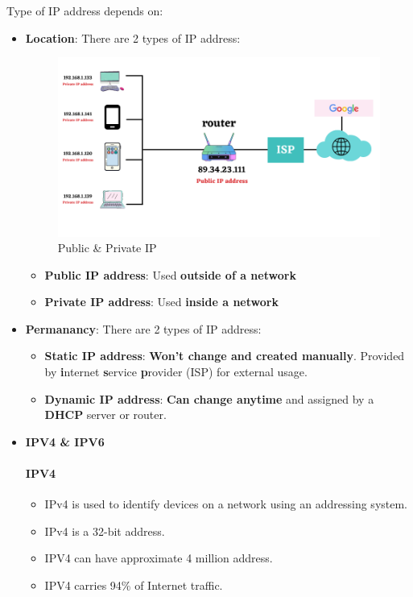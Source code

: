 \setlength{\columnsep}{3pt}
\begin{flushleft}

Type of IP address depends on:
\begin{itemize}
	\item \textbf{Location}: There are 2 types of IP address:
	\begin{figure}[h!]
		\centering
		\includegraphics[scale=0.4]{content/chapter14/images/public_private.png}
		\caption{Public \& Private IP}
		\label{fig:public_private_ip}
	\end{figure}
	
	\begin{itemize}
		\item \textbf{Public IP address}: Used \textbf{outside of a network}
		\item \textbf{Private IP address}: Used \textbf{inside a network}
	\end{itemize}
	\bigskip
	\bigskip
	\item \textbf{Permanancy}: There are 2 types of IP address:
	\begin{itemize}
		\item \textbf{Static IP address}: \textbf{Won't change and created manually}. Provided by \textbf{i}nternet \textbf{s}ervice \textbf{p}rovider (ISP) for external usage. 
		\item \textbf{Dynamic IP address}: \textbf{Can change anytime} and assigned by a \textbf{DHCP} server or router.
	\end{itemize}
	\bigskip
	\bigskip
	\item \textbf{IPV4 \& IPV6}
	\paragraph{IPV4}
	\begin{itemize}
		\item IPv4 is used to identify devices on a network using an addressing system.
		\item IPv4 is a 32-bit address.
		\item IPV4 can have approximate 4 million address.
		\item IPV4 carries 94\% of Internet traffic.
	\end{itemize}

\end{itemize}
\end{flushleft}

